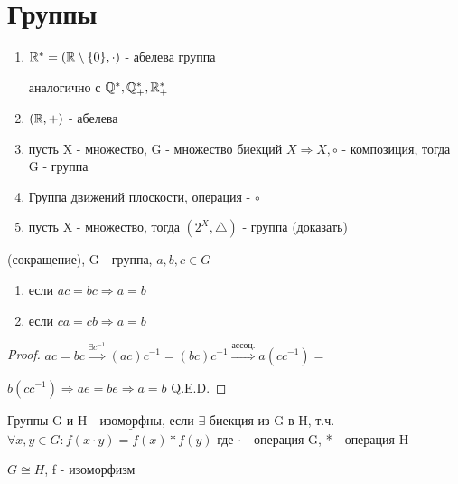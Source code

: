 
\DeclareRobustCommand{\divby}{%
  \mathrel{\vbox{\baselineskip.65ex\lineskiplimit0pt\hbox{.}\hbox{.}\hbox{.}}}%
}


\section{Группы}

\begin{eg}
    \begin{enumerate}
        \item $\mathbb{R}^{*} = (\mathbb{R} \setminus \{0\} , \cdot  )$ - абелева группа
        

        аналогично с $\mathbb{Q}^*, \mathbb{Q}^{*}_{+}, \mathbb{R}^{*}_{+}$
        \item $(\mathbb{R}, +)$ - абелева
        \item пусть X - множество, G - множество биекций $X \Rightarrow X, \circ$ - композиция, тогда G - группа
        \item Группа движений плоскости, операция - $\circ$
        \item пусть X - множество, тогда $(2^{X}, \triangle)$ - группа (доказать)
    \end{enumerate}
\end{eg}

\begin{property} (сокращение), G - группа, $a, b, c \in G$
    \begin{enumerate}
        \item если $ac = bc \Rightarrow a = b$
        \item если $ca = cb \Rightarrow a = b$
    \end{enumerate}
    \begin{proof}
        $ac = bc \overset{\exists c^{-1}}{\Rightarrow} (ac)c^{-1} = (bc)c^{-1} \overset{\text{ассоц.}}{\Rightarrow} a(cc^{-1}) = $
        
        $b(cc^{-1}) \Rightarrow ae = be \Rightarrow a = b$ Q.E.D.
    \end{proof}
\end{property}

\begin{definition}
    Группы G и H - $\underline{\text{изоморфны}}$, если $\exists$ биекция из G в H, т.ч. $\forall x, y \in G: f(x \cdot  y) = f(x) * f(y)$
    где $\cdot$ - операция G, * - операция H
\end{definition}

\begin{notation}
    $G \cong H$, f - изоморфизм
\end{notation}

